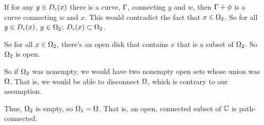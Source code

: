 \documentclass[a4paper,12pt]{article}
\begin{document}
\tab If for any $y \in D_\epsilon(x)$ there is a curve, $\Gamma$, connecting $y$ and $w$, then $\Gamma \dotplus \phi$ is a curve connecting $w$ and $x$. This would contradict the fact that $x \in \Omega_2$. So for all $y \in D_\epsilon(x)$, $y \in \Omega_2$; $D_\epsilon(x) \subset \Omega_2$.

\tab So for all $x \in \Omega_2$, there's an open disk that contains $x$ that is a subset of $\Omega_2$. So $\Omega_2$ is open.

So if $\Omega_2$ was nonempty, we would have two nonempty open sets whose union was $\Omega$. That is, we would be able to disconnect $\Omega$, which is contrary to our assumption.

Thus, $\Omega_2$ is empty, so $\Omega_1=\Omega$. That is, an open, connected subset of $\mathbb{C}$ is path-connected.

\shunt
\end{document}
